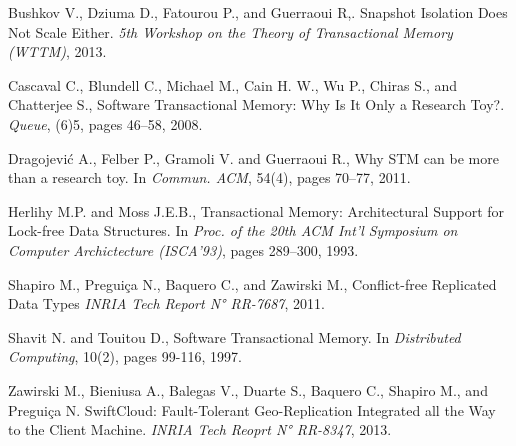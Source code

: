 \documentclass[11pt,letterpaper]{article}
\begin{document}
\begin{thebibliography}{99}
\small{


Bushkov V., Dziuma D., Fatourou P., and Guerraoui R,.
Snapshot Isolation Does Not Scale Either.
{\it 5th Workshop on the Theory of Transactional Memory (WTTM)}, 2013.


Cascaval C., Blundell C., Michael M., Cain H. W., Wu P., Chiras S., and Chatterjee S.,
Software Transactional Memory: Why Is It Only a Research Toy?.
{\it Queue}, (6)5,  pages 46--58, 2008.



Dragojevi\'{c} A., Felber P., Gramoli V. and Guerraoui R.,
\newblock Why {STM} can be more than a research toy.
\newblock In {\em Commun. ACM}, 54(4), pages 70--77, 2011.


Herlihy M.P.  and Moss J.E.B., 
Transactional Memory: Architectural Support for Lock-free Data Structures. 
In {\it Proc. of the 20th ACM Int'l Symposium  on Computer Archictecture (ISCA'93)}, 
pages 289--300, 1993. 


Shapiro M., Pregui{\c c}a N., Baquero C., and Zawirski M.,
Conflict-free Replicated Data Types
{\it INRIA Tech Report N° RR-7687}, 2011.



Shavit N. and Touitou D., 
\newblock Software Transactional Memory. 
\newblock In {\it Distributed  Computing}, 10(2), pages 99-116, 1997. 


Zawirski M., Bieniusa A., Balegas V., Duarte S., Baquero C., Shapiro M., and Pregui{\c c}a N.
SwiftCloud: Fault-Tolerant Geo-Replication Integrated all the Way to the Client Machine.
{\it INRIA Tech Reoprt N° RR-8347}, 2013.




}
\end{thebibliography}
\end{document}
